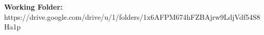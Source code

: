 \documentclass[a4paper]{article}
\begin{document}
\hypersetup{pageanchor=true}
\tableofcontents
\clearpage
{}



\clearpage
\noindent\textbf{Working Folder:} https://drive.google.com/drive/u/1/folders/1x6AFPM674hFZBAjrw9LdjVdf54S8Ha1p
\end{document}
